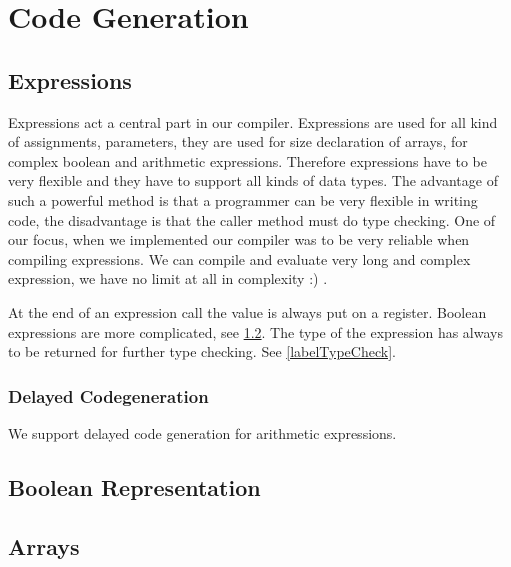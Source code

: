 \section{Code Generation}

\subsection{Expressions}

Expressions act a central part in our compiler. Expressions are used for all kind of assignments, parameters, they are used for size declaration of arrays, for complex boolean and arithmetic expressions. Therefore expressions have to be very flexible and they have to support all kinds of data types. The advantage of such a powerful method is that a programmer can be very flexible in writing code, the disadvantage is that the caller method must do type checking.
One of our focus, when we implemented our compiler was to be very reliable when compiling expressions. We can compile and evaluate very long and complex expression, we have no limit at all in complexity :) .

At the end of an expression call the value is always put on a register. Boolean expressions are more complicated, see \ref{labelBoolean}. The type of the expression has always to be returned for further type checking. See \ref{labelTypeCheck}.

\subsubsection{Delayed Codegeneration}
We support delayed code generation for arithmetic expressions.



\subsection{Boolean Representation}
\label{labelBoolean}

\subsection{Arrays}